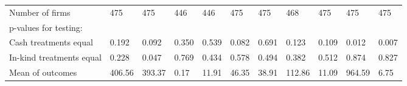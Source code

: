 \begin{table}[H]
{\begin{tabular}{lllllllllll}
\hspace{1em}Number of firms & 475 & 475 & 446 & 446 & 475 & 475 & 468 & 475 & 475 & 475\\
\hspace{1em}p-values for testing: &  &  &  &  &  &  &  &  &  & \\
\hspace{1em}\hspace{1em} Cash treatments equal & 0.192 & 0.092 & 0.350 & 0.539 & 0.082 & 0.691 & 0.123 & 0.109 & 0.012 & 0.007\\
\hspace{1em}\hspace{1em} In-kind treatments equal & 0.228 & 0.047 & 0.769 & 0.434 & 0.578 & 0.494 & 0.382 & 0.512 & 0.874 & 0.827\\
\hspace{1em}Mean of outcomes & 406.56 & 393.37 & 0.17 & 11.91 & 46.35 & 38.91 & 112.86 & 11.09 & 964.59 & 6.75\\
\bottomrule
\end{tabular}}
\end{table}
